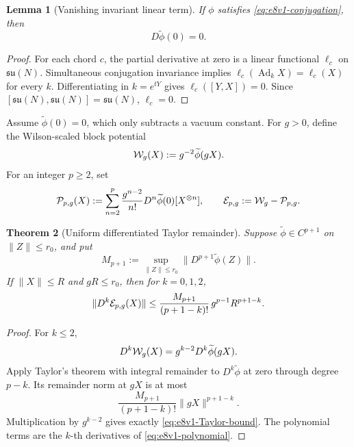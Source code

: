 \documentclass[11pt,oneside]{book}
\newtheorem{theorem}{Theorem}[chapter]
\newtheorem{lemma}[theorem]{Lemma}
\theoremstyle{definition}
\theoremstyle{remark}
\begin{document}
\begin{lemma}[Vanishing invariant linear term]
\label{lem:e8v1-linear}
If \(\phi\) satisfies \eqref{eq:e8v1-conjugation}, then
\[
 D\widetilde\phi(0)=0.                               \label{eq:e8v1-linear-zero}
\]
\end{lemma}

\begin{proof}
For each chord \(c\), the partial derivative at zero is a linear
functional \(\ell_c\) on \(\mathfrak{su}(N)\).  Simultaneous
conjugation invariance implies
\(\ell_c(\operatorname{Ad}_kX)=\ell_c(X)\) for every \(k\).
Differentiating in \(k=e^{tY}\) gives
\(\ell_c([Y,X])=0\).  Since
\([\mathfrak{su}(N),\mathfrak{su}(N)]=\mathfrak{su}(N)\),
\(\ell_c=0\).
\end{proof}

Assume \(\widetilde\phi(0)=0\), which only subtracts a vacuum constant.
For \(g>0\), define the Wilson-scaled block potential
\[
 {\cal W}_g(X):=g^{-2}\widetilde\phi(gX).             \label{eq:e8v1-Wg}
\]
For an integer \(p\geq2\), set
\[
 {\cal P}_{p,g}(X)
 :=
 \sum_{n=2}^{p}
 \frac{g^{n-2}}{n!}
 D^n\widetilde\phi(0)[X^{\otimes n}],
 \qquad
 {\cal E}_{p,g}:={\cal W}_g-{\cal P}_{p,g}.           \label{eq:e8v1-polynomial}
\]

\begin{theorem}[Uniform differentiated Taylor remainder]
\label{thm:e8v1-Taylor}
Suppose \(\widetilde\phi\in C^{p+1}\) on
\(\|Z\|\leq r_0\), and put
\[
 M_{p+1}:=
 \sup_{\|Z\|\leq r_0}\|D^{p+1}\widetilde\phi(Z)\|.
                                                        \label{eq:e8v1-M}
\]
If \(\|X\|\leq R\) and \(gR\leq r_0\), then for
\(k=0,1,2\),
\[
 \|D^k{\cal E}_{p,g}(X)\|
 \leq
 \frac{M_{p+1}}{(p+1-k)!}\,
 g^{p-1}R^{p+1-k}.                                   \label{eq:e8v1-Taylor-bound}
\]
\end{theorem}

\begin{proof}
For \(k\leq2\),
\[
 D^k{\cal W}_g(X)
 =
 g^{k-2}D^k\widetilde\phi(gX).                       \label{eq:e8v1-scaled-derivative}
\]
Apply Taylor's theorem with integral remainder to
\(D^k\widetilde\phi\) at zero through degree \(p-k\).
Its remainder norm at \(gX\) is at most
\[
 \frac{M_{p+1}}{(p+1-k)!}\|gX\|^{p+1-k}.
\]
Multiplication by \(g^{k-2}\) gives exactly
\eqref{eq:e8v1-Taylor-bound}.  The polynomial terms are the
\(k\)-th derivatives of \eqref{eq:e8v1-polynomial}.
\end{proof}
\end{document}
